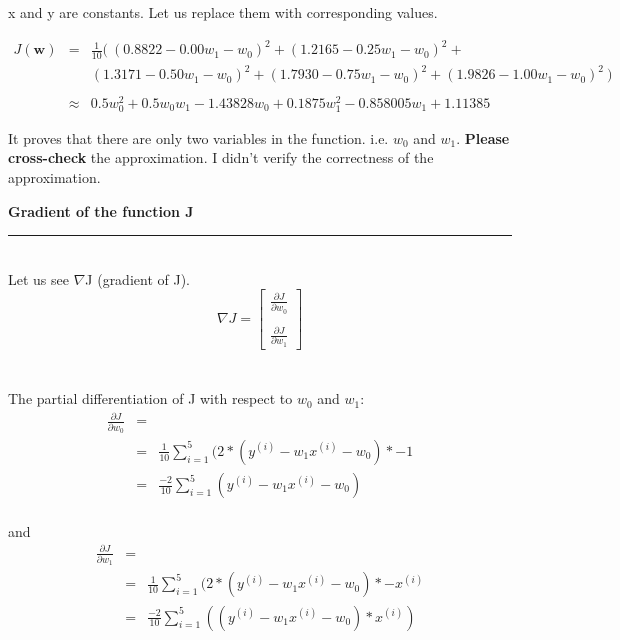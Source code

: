 \documentclass[12pt]{article}
\begin{document}
\vspace{3mm}

\noindent x and y are constants. Let us replace them with corresponding values.


\begin{eqnarray*}
J(\mathbf{w}) & = & \frac{1}{10} (\ (0.8822 -  0.00 w_1 - w_0)^2 + 
      (1.2165 - 0.25 w_1 - w_0)^2 + \\ 
& &   (1.3171 - 0.50 w_1 - w_0)^2 + 
     (1.7930 - 0.75 w_1 - w_0)^2 + 
      (1.9826 - 1.00 w_1 - w_0)^2\ ) \\
\\
& \approx & 0.5 w_0^2 + 0.5 w_0 w_1 - 1.43828 w_0 + 0.1875 w_1^2 - 0.858005 w_1 + 1.11385 
\end{eqnarray*}

\vspace{2mm}
 
It proves that there are only two variables in the function. i.e. $w_0$ and $w_1$. 
\textbf{Please cross-check} the approximation. I didn't verify the correctness of the approximation. 


\break
{\Large \textbf{Gradient of the function J}} \\
\rule{\textwidth}{1pt}
\vspace{3mm} \\
\noindent Let us see $\nabla$J (gradient of J).
\[
\nabla J =
\begin{bmatrix}
    \frac{\partial J}{\partial w_0} \\
\\
    \frac{\partial J}{\partial w_1} 
\end{bmatrix}
\] \\
\vspace{5mm} \\
\noindent The partial differentiation of J with respect to $w_0$ and $w_1$:\\
\begin{eqnarray*}
\frac{\partial J}{\partial w_0} & = \\
& = & \frac{1}{10} \sum_{i=1}^{5} ( 2 * (y^{(i)} - w_1x^{(i)} - w_0) * -1 \\
& = & \frac{-2}{10} \sum_{i=1}^{5} (y^{(i)} - w_1x^{(i)} - w_0)
\end{eqnarray*}
\vspace{4mm} \\
\noindent and
\vspace{3mm} \\ 
\begin{eqnarray*}
\frac{\partial J}{\partial w_1} & = \\ 
& = & \frac{1}{10} \sum_{i=1}^{5} ( 2 * (y^{(i)} - w_1x^{(i)} - w_0) * -x^{(i)} \\
& = & \frac{-2}{10} \sum_{i=1}^{5} ( (y^{(i)} - w_1x^{(i)} - w_0) * x^{(i)} )
\end{eqnarray*}
 
\end{document}
